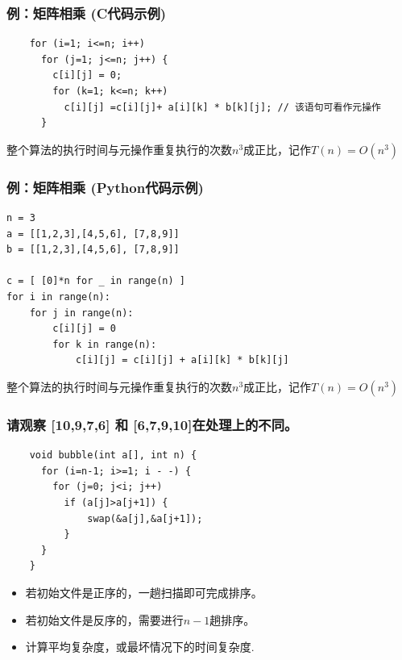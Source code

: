 \begin{frame}[fragile]
  \frametitle{例：矩阵相乘 (C代码示例)}
  \begin{verbatim}
    for (i=1; i<=n; i++)
      for (j=1; j<=n; j++) {
        c[i][j] = 0;
        for (k=1; k<=n; k++)
          c[i][j] =c[i][j]+ a[i][k] * b[k][j]; // 该语句可看作元操作
      }
  \end{verbatim}

  \begin{tcolorbox}
    整个算法的执行时间与元操作重复执行的次数$n^3$成正比，记作$T(n) = O(n^3)$
  \end{tcolorbox}
\end{frame}

\begin{frame}[fragile]
  \frametitle{例：矩阵相乘 (Python代码示例)}
  \begin{verbatim}
n = 3
a = [[1,2,3],[4,5,6], [7,8,9]]
b = [[1,2,3],[4,5,6], [7,8,9]]

c = [ [0]*n for _ in range(n) ]
for i in range(n):
    for j in range(n):
        c[i][j] = 0
        for k in range(n):
            c[i][j] = c[i][j] + a[i][k] * b[k][j]
  \end{verbatim}

  \begin{tcolorbox}
    整个算法的执行时间与元操作重复执行的次数$n^3$成正比，记作$T(n) = O(n^3)$
  \end{tcolorbox}
\end{frame}

\begin{frame}[fragile]
  \frametitle{请观察 [10,9,7,6] 和 [6,7,9,10]在处理上的不同。}
  \begin{verbatim}
    void bubble(int a[], int n) {
      for (i=n-1; i>=1; i - -) {
        for (j=0; j<i; j++)
          if (a[j]>a[j+1]) {
              swap(&a[j],&a[j+1]);
          }
      }
    }
  \end{verbatim}

  \pause

  \begin{itemize}
  \item 若初始文件是正序的，一趟扫描即可完成排序。
  \item 若初始文件是反序的，需要进行$n-1$趟排序。
  \item \color{red}计算平均复杂度，或最坏情况下的时间复杂度.
  \end{itemize}
\end{frame}

